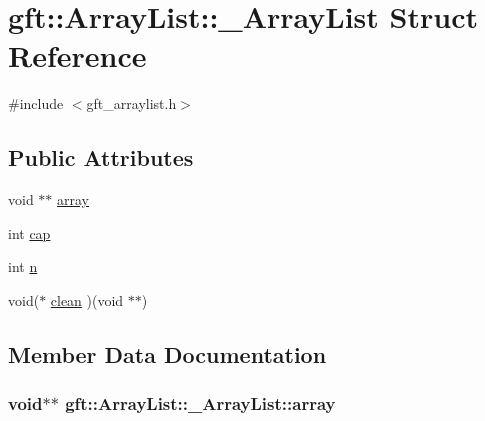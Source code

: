 \hypertarget{structgft_1_1ArrayList_1_1__ArrayList}{}\section{gft\+:\+:Array\+List\+:\+:\+\_\+\+Array\+List Struct Reference}
\label{structgft_1_1ArrayList_1_1__ArrayList}


{\ttfamily \#include $<$gft\+\_\+arraylist.\+h$>$}

\subsection*{Public Attributes}
\begin{DoxyCompactItemize}
\item 
void $\ast$$\ast$ \hyperlink{structgft_1_1ArrayList_1_1__ArrayList_ad738f27dd09a422d567989d58566cbe6}{array}
\item 
int \hyperlink{structgft_1_1ArrayList_1_1__ArrayList_a76c12c6e45ba96915e6ba9c1d31286fd}{cap}
\item 
int \hyperlink{structgft_1_1ArrayList_1_1__ArrayList_aabc5a9bbc1e57a7e7a9a31db2902df0d}{n}
\item 
void($\ast$ \hyperlink{structgft_1_1ArrayList_1_1__ArrayList_a964cc7d790fd0f0fe7606235e1ca4a35}{clean} )(void $\ast$$\ast$)
\end{DoxyCompactItemize}


\subsection{Member Data Documentation}
\subsubsection[{\texorpdfstring{array}{array}}]{\setlength{\rightskip}{0pt plus 5cm}void$\ast$$\ast$ gft\+::\+Array\+List\+::\+\_\+\+Array\+List\+::array}\hypertarget{structgft_1_1ArrayList_1_1__ArrayList_ad738f27dd09a422d567989d58566cbe6}{}\label{structgft_1_1ArrayList_1_1__ArrayList_ad738f27dd09a422d567989d58566cbe6}
